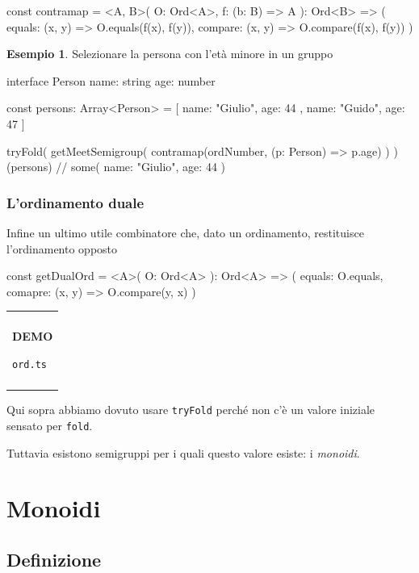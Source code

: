 \documentclass[12pt]{article}
\theoremstyle{definition}
\newtheorem{example}{Esempio}[section]
\newenvironment{demo}
    {\begin{center}
    \begin{tabular}{|p{0.9\textwidth}|}
    \hline\\
    }
    {
    \\\\\hline
    \end{tabular}
    \end{center}
    }
\newenvironment{code}
  {\vspace{0.5cm} \VerbatimEnvironment\begin{typescriptcode}}
  {\end{typescriptcode} \vspace{0.2cm}}
\begin{document}
\begin{code}
const contramap = <A, B>(
  O: Ord<A>,
  f: (b: B) => A
): Ord<B> => ({
  equals: (x, y) => O.equals(f(x), f(y)),
  compare: (x, y) => O.compare(f(x), f(y))
})
\end{code}

\begin{example}
Selezionare la persona con l'età minore in un gruppo

\begin{code}
interface Person {
  name: string
  age: number
}

const persons: Array<Person> = [
  { name: "Giulio", age: 44 },
  { name: "Guido", age: 47 }
]

tryFold(
  getMeetSemigroup(
    contramap(ordNumber, (p: Person) => p.age)
  )
)(persons) // some({ name: "Giulio", age: 44 })
\end{code}
\end{example}

\subsubsection{L'ordinamento duale}

Infine un ultimo utile combinatore che, dato un ordinamento, restituisce l'ordinamento opposto

\begin{code}
const getDualOrd = <A>(
  O: Ord<A>
): Ord<A> => ({
  equals: O.equals,
  comapre: (x, y) => O.compare(y, x)
})
\end{code}

\begin{demo}
\begin{center}
\textbf{DEMO}

\texttt{ord.ts}
\end{center}
\end{demo}


Qui sopra abbiamo dovuto usare \texttt{tryFold} perché non c'è un valore iniziale sensato per \texttt{fold}.

Tuttavia esistono semigruppi per i quali questo valore esiste: i \emph{monoidi}.

\section{Monoidi}

\subsection{Definizione}
\end{document}
